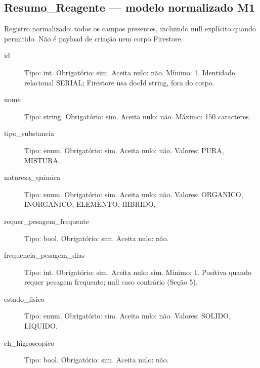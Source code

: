 \subsection*{Resumo\_Reagente --- modelo normalizado M1}
Registro normalizado: todos os campos presentes, incluindo null explícito quando permitido. Não é payload de criação nem corpo Firestore.
\begin{description}
\item[id] Tipo: int. Obrigatório: sim. Aceita nulo: não.
Mínimo: 1.
Identidade relacional SERIAL; Firestore usa docId string, fora do corpo.
\item[nome] Tipo: string. Obrigatório: sim. Aceita nulo: não.
Máximo: 150 caracteres.
\item[tipo\_substancia] Tipo: enum. Obrigatório: sim. Aceita nulo: não.
Valores: PURA, MISTURA.
\item[natureza\_quimica] Tipo: enum. Obrigatório: sim. Aceita nulo: não.
Valores: ORGANICO, INORGANICO, ELEMENTO, HIBRIDO.
\item[requer\_pesagem\_frequente] Tipo: bool. Obrigatório: sim. Aceita nulo: não.
\item[frequencia\_pesagem\_dias] Tipo: int. Obrigatório: sim. Aceita nulo: sim.
Mínimo: 1.
Positiva quando requer pesagem frequente; null caso contrário (Seção 5).
\item[estado\_fisico] Tipo: enum. Obrigatório: sim. Aceita nulo: não.
Valores: SOLIDO, LIQUIDO.
\item[eh\_higroscopico] Tipo: bool. Obrigatório: sim. Aceita nulo: não.
\end{description}
